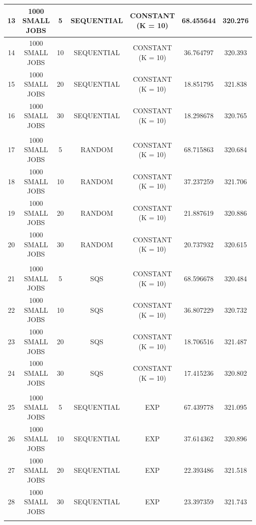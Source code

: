 \documentclass{article}
\begin{document}
\begin{table}
\begin{tabular}{|c | c | c | c | c | c | c |}
13 & 1000 SMALL JOBS & 5  & SEQUENTIAL & CONSTANT (K = 10) & 68.455644 & 320.276 \\ \hline
14 & 1000 SMALL JOBS & 10 & SEQUENTIAL & CONSTANT (K = 10) & 36.764797 & 320.393 \\ \hline
15 & 1000 SMALL JOBS & 20 & SEQUENTIAL & CONSTANT (K = 10) & 18.851795 & 321.838 \\ \hline
16 & 1000 SMALL JOBS & 30 & SEQUENTIAL & CONSTANT (K = 10) & 18.298678 & 320.765 \\ \hline
   &                 &    &            &                   &           &         \\ \hline
17 & 1000 SMALL JOBS & 5  & RANDOM     & CONSTANT (K = 10) & 68.715863 & 320.684 \\ \hline
18 & 1000 SMALL JOBS & 10 & RANDOM     & CONSTANT (K = 10) & 37.237259 & 321.706 \\ \hline
19 & 1000 SMALL JOBS & 20 & RANDOM     & CONSTANT (K = 10) & 21.887619 & 320.886 \\ \hline
20 & 1000 SMALL JOBS & 30 & RANDOM     & CONSTANT (K = 10) & 20.737932 & 320.615 \\ \hline
   &                 &    &            &                   &           &         \\ \hline
21 & 1000 SMALL JOBS & 5  & SQS        & CONSTANT (K = 10) & 68.596678 & 320.484 \\ \hline
22 & 1000 SMALL JOBS & 10 & SQS        & CONSTANT (K = 10) & 36.807229 & 320.732 \\ \hline
23 & 1000 SMALL JOBS & 20 & SQS        & CONSTANT (K = 10) & 18.706516 & 321.487 \\ \hline
24 & 1000 SMALL JOBS & 30 & SQS        & CONSTANT (K = 10) & 17.415236 & 320.802 \\ \hline
   &                 &    &            &                   &           &         \\ \hline
25 & 1000 SMALL JOBS & 5  & SEQUENTIAL & EXP               & 67.439778 & 321.095 \\ \hline
26 & 1000 SMALL JOBS & 10 & SEQUENTIAL & EXP               & 37.614362 & 320.896 \\ \hline
27 & 1000 SMALL JOBS & 20 & SEQUENTIAL & EXP               & 22.393486 & 321.518 \\ \hline
28 & 1000 SMALL JOBS & 30 & SEQUENTIAL & EXP               & 23.397359 & 321.743 \\ \hline
   &                 &    &            &                   &           &         \\ \hline

\end{tabular}
\end{table}
\end{document}
